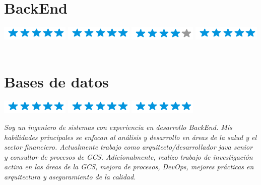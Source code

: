 \documentclass[]{cv-class}
\begin{document}
\begin{aside}
	\section{BackEnd}
	{\includegraphics[scale=0.40]{img/5stars.png}}
	{\includegraphics[scale=0.40]{img/5stars.png}}
	{\includegraphics[scale=0.40]{img/4stars.png}}
	{\includegraphics[scale=0.40]{img/5stars.png}}
	~

	\section{Bases de datos}
	{\includegraphics[scale=0.40]{img/5stars.png}}
	{\includegraphics[scale=0.40]{img/5stars.png}}
	{\includegraphics[scale=0.40]{img/5stars.png}}

\end{aside}

\justifying
	\begin{small}
\textit{
    Soy un ingeniero de sistemas con experiencia en desarrollo BackEnd. Mis habilidades principales se enfocan al análisis y desarrollo en áreas de la salud y el sector financiero. Actualmente trabajo como arquitecto/desarrollador java senior y consultor de procesos de GCS. Adicionalmente, realizo trabajo de investigación activa en las áreas de la GCS, mejora de procesos, DevOps, mejores prácticas en arquitectura y aseguramiento de la calidad.}
	\end{small}
\end{document}
